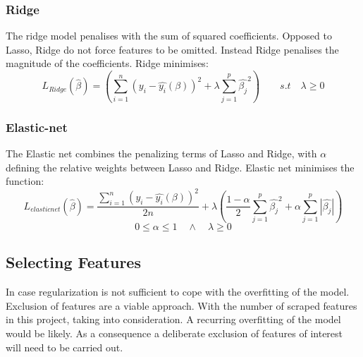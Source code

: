 \documentclass[12pt,a4paper]{article}
\begin{document}
\subsubsection{Ridge}
The ridge model penalises with the sum of squared coefficients. Opposed to Lasso, Ridge do not force features to be omitted. Instead Ridge penalises the magnitude of the coefficients. Ridge minimises:
$$L_{Ridge}(\hat{\beta}) = \left(\sum_{i=1}^{n} (y_i-\hat{y_i}(\beta))^2+\lambda\sum_{j=1}^{p}\hat{\beta_j}^2\right) \qquad s.t \quad \lambda \geq 0 $$ 


\subsubsection{Elastic-net}
The Elastic net combines the penalizing terms of Lasso and Ridge, with $\alpha$ defining the relative weights between Lasso and Ridge. Elastic net minimises the function: 
$$L_{elasticnet}(\hat{\beta}) = \frac{\sum_{i=1}^{n}\left(y_i-\hat{y_i}(\beta)\right)^2}{2n} + \lambda\left(\frac{1-\alpha}{2}\sum_{j=1}^{p}\hat{\beta_j}^2+\alpha\sum_{j=1}^{p}|\hat{\beta_j}|\right)$$
$$0 \leq \alpha \leq 1 \quad \wedge \quad \lambda \geq 0$$

\subsection{Selecting Features}
In case regularization is not sufficient to cope with the overfitting of the model. Exclusion of features are a viable approach. With the number of scraped features in this project, taking into consideration. A recurring overfitting of the model would be likely. As a consequence a deliberate exclusion of features of interest will need to be carried out.    
\end{document}
